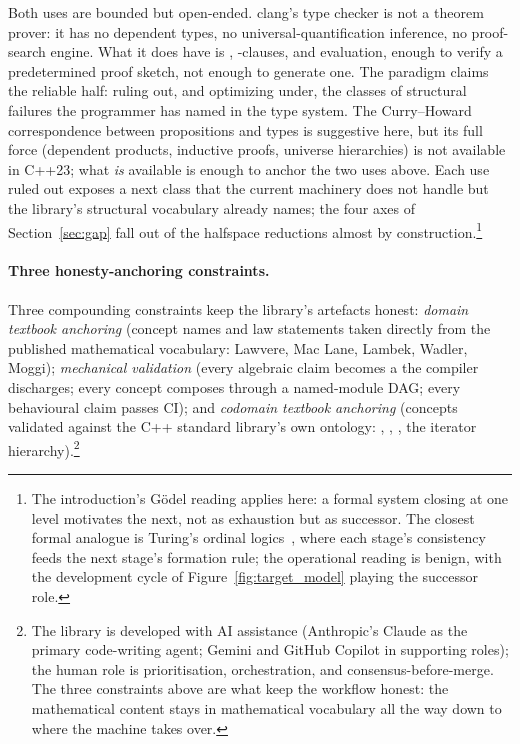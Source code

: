 \documentclass[11pt, a4paper]{article}
\begin{document}
Both uses are bounded but open-ended.  clang's type checker is not a
theorem prover: it has no dependent types, no universal-quantification
inference, no proof-search engine.  What it does have is
, -clauses, and
 evaluation, enough to verify a predetermined
proof sketch, not enough to generate one.  The paradigm claims the
reliable half: ruling out, and optimizing under, the classes of
structural failures the programmer has named in the type system.  The
Curry--Howard correspondence between propositions and types is
suggestive here, but its full force (dependent products, inductive
proofs, universe hierarchies) is not available in C++23; what
\emph{is} available is enough to anchor the two uses above.  Each use
ruled out exposes a next class that the current machinery does not
handle but the library's structural vocabulary already names; the four
axes of Section~\ref{sec:gap} fall out of the halfspace reductions
almost by construction.\footnote{The introduction's G\"odel reading
applies here: a formal system closing at one level motivates the next,
not as exhaustion but as successor.  The closest formal analogue is
Turing's ordinal logics~\cite{turing1939ordinals}, where each stage's
consistency feeds the next stage's formation rule; the operational
reading is benign, with the development cycle of
Figure~\ref{fig:target_model} playing the successor role.}

\paragraph{Three honesty-anchoring constraints.}
Three compounding constraints keep the library's artefacts honest:
\emph{domain textbook anchoring} (concept names and law statements
taken directly from the published mathematical vocabulary:
Lawvere, Mac Lane, Lambek, Wadler, Moggi); \emph{mechanical
validation} (every algebraic claim becomes a
 the compiler discharges; every concept
composes through a named-module DAG; every behavioural claim passes
CI); and \emph{codomain textbook anchoring} (concepts validated
against the C++ standard library's own ontology:
, ,
, the iterator
hierarchy).\footnote{The library is developed with AI assistance
(Anthropic's Claude as the primary code-writing agent; Gemini and
GitHub Copilot in supporting roles); the human role is
prioritisation, orchestration, and consensus-before-merge.  The
three constraints above are what keep the workflow honest: the
mathematical content stays in mathematical vocabulary all the way
down to where the machine takes over.}
\end{document}
